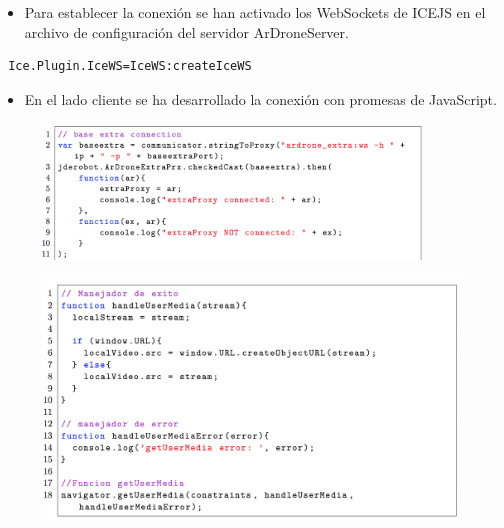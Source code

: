 \documentclass[notes,slidesec,a4]{seminar}
\begin{document}
\begin{hslide}
\begin{itemize}
\item Para establecer la conexión se han activado los WebSockets de ICEJS en el archivo de configuración del servidor ArDroneServer.
\end{itemize}
\lstset{}
\begin{lstlisting}
 Ice.Plugin.IceWS=IceWS:createIceWS
\end{lstlisting}
\begin{itemize}
\item En el lado cliente se ha desarrollado la conexión con promesas de JavaScript.
\end{itemize}

\begin{center}
\begin{figure}
\includegraphics[width=0.9\textwidth]{img/promiseconexionlocal}
\end{figure}
\end{center}
\end{hslide}


\begin{hslide}
\begin{center}
\begin{figure}
\includegraphics[width=1.1\textwidth]{img/getusermedia}
\end{figure}
\end{center}
\end{hslide}
\end{document}
